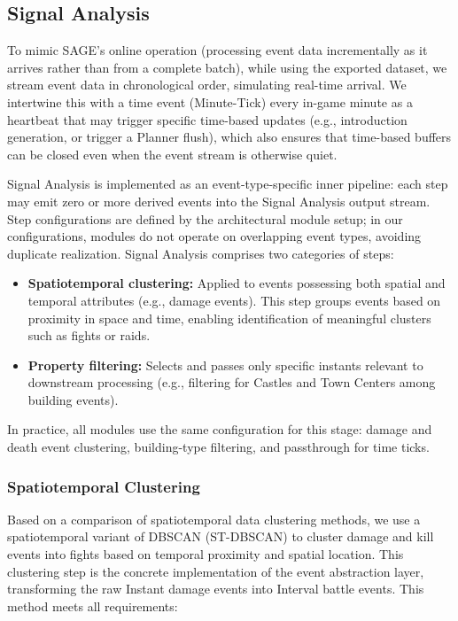 \subsection{Signal Analysis}
To mimic SAGE's online operation (processing event data incrementally as it arrives rather than from a complete batch), while using the exported dataset, we stream event data in chronological order, simulating real-time arrival. We intertwine this with a time event (Minute-Tick) every in-game minute as a heartbeat that may trigger specific time-based updates (e.g., introduction generation, or trigger a Planner flush), which also ensures that time-based buffers can be closed even when the event stream is otherwise quiet.

Signal Analysis is implemented as an event-type-specific inner pipeline: each step may emit zero or more derived events into the Signal Analysis output stream. Step configurations are defined by the architectural module setup; in our configurations, modules do not operate on overlapping event types, avoiding duplicate realization. Signal Analysis comprises two categories of steps:

\begin{itemize}
  \item \textbf{Spatiotemporal clustering:} Applied to events possessing both spatial and temporal attributes (e.g., damage events). This step groups events based on proximity in space and time, enabling identification of meaningful clusters such as fights or raids.
  \item \textbf{Property filtering:} Selects and passes only specific instants relevant to downstream processing (e.g., filtering for Castles and Town Centers among building events).
\end{itemize}

In practice, all modules use the same configuration for this stage: damage and death event clustering, building-type filtering, and passthrough for time ticks.

\subsubsection{Spatiotemporal Clustering}
Based on a comparison of spatiotemporal data clustering methods, we use a spatiotemporal variant of DBSCAN (ST-DBSCAN)\cite{shi2019, ansari2020} to cluster damage and kill events into fights based on temporal proximity and spatial location. This clustering step is the concrete implementation of the event abstraction layer, transforming the raw Instant damage events into Interval battle events. This method meets all requirements:

